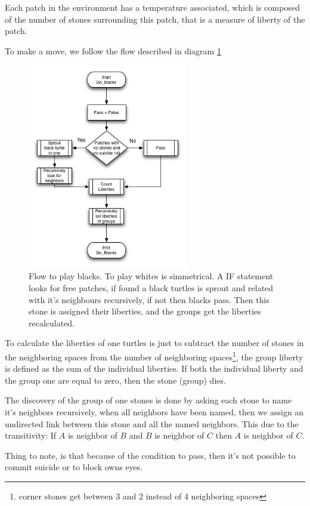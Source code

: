 \documentclass[a4paper,10pt,twocolumn]{article}
\begin{document}
\begin{CJK*}{UTF8}{gbsn}
Each patch in the environment has a temperature associated, which is composed of the number of stones surrounding this patch, that is a measure of liberty of the patch. 

To make a move, we follow the flow described in diagram \ref{d2}

\begin{figure}[!ht]
\begin{center}
\includegraphics[width=7cm]{go_blacks.png}
\caption{\footnotesize Flow to play blacks. To play whites is simmetrical. A IF statement looks for free patches, if found a black turtles is sprout and related with it's neighbours recursively, if not then blacks pass. Then this stone is assigned their liberties, and the groups get the liberties recalculated.\label{d2}}
\end{center}
\end{figure}

To calculate the liberties of one turtles is just to subtract the number of stones in the neighboring spaces from the number of neighboring spaces\footnote{corner stones get between 3 and 2 instead of 4 neighboring spaces}, the group liberty is defined as the sum of the individual liberties. If both the individual liberty and the group one are equal to zero, then the stone (group) dies. 

The discovery of the group of one stones is done by asking each stone to name it's neighbors recursively, when all neighbors have been named, then we assign an undirected link between this stone and all the named neighbors. This due to the transitivity: If $A$ is neighbor of $B$ and $B$ is neighbor of $C$ then $A$ is neighbor of $C$.

Thing to note, is that because of the condition to pass, then it's not possible to commit suicide or to block owns eyes. 


\end{CJK*}
\end{document}
